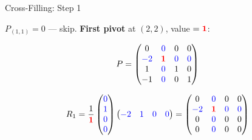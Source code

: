 \documentclass[10pt]{beamer}
\theoremstyle{definition}
\newcommand{\x}[1]{\alert{\textbf{#1}}}
\newcommand{\pvt}[1]{{\color{red}\mathbf{#1}}}       %
\newcommand{\crs}[1]{{\color{blue}#1}}                %
\begin{document}
\begin{frame}{Cross-Filling: Step 1}

$P_{(1,1)} = 0$ --- skip. \quad \x{First pivot} at $(2,2)$, value $= \pvt{1}$:

$$P = \begin{pmatrix} 0 & \crs{0} & 0 & 0 \\ \crs{-2} & \pvt{1} & \crs{0} & \crs{0} \\ 1 & \crs{0} & 1 & 0 \\ -1 & \crs{0} & 0 & 1 \end{pmatrix}$$

$$R_1 = \frac{1}{\pvt{1}}\begin{pmatrix} \crs{0} \\ \crs{1} \\ \crs{0} \\ \crs{0} \end{pmatrix} \begin{pmatrix} \crs{-2} & \crs{1} & \crs{0} & \crs{0} \end{pmatrix}
= \begin{pmatrix} 0 & \crs{0} & 0 & 0 \\ \crs{-2} & \pvt{1} & \crs{0} & \crs{0} \\ 0 & \crs{0} & 0 & 0 \\ 0 & \crs{0} & 0 & 0 \end{pmatrix}$$

\end{frame}
\end{document}
